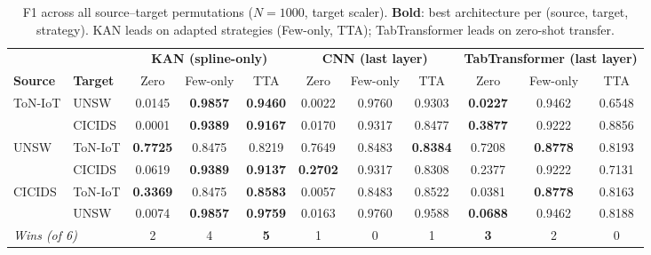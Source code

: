\begin{table}[t]
\centering
\caption{F1 across all source--target permutations ($N{=}1000$, target scaler).
  \textbf{Bold}: best architecture per (source, target, strategy).
  KAN leads on adapted strategies (Few-only, TTA); TabTransformer leads on zero-shot transfer.}
\label{tab:main_results}
\begin{tabular}{l|l|ccc|ccc|ccc}
\toprule
& & \multicolumn{3}{c|}{\textbf{KAN (spline-only)}} & \multicolumn{3}{c|}{\textbf{CNN (last layer)}} & \multicolumn{3}{c}{\textbf{TabTransformer (last layer)}} \\
\textbf{Source} & \textbf{Target} & Zero & Few-only & TTA & Zero & Few-only & TTA & Zero & Few-only & TTA \\
\midrule
\multirow{2}{*}{ToN-IoT}
    & UNSW    & 0.0145 & \textbf{0.9857} & \textbf{0.9460} & 0.0022 & 0.9760 & 0.9303 & \textbf{0.0227} & 0.9462 & 0.6548 \\
    & CICIDS  & 0.0001 & \textbf{0.9389} & \textbf{0.9167} & 0.0170 & 0.9317 & 0.8477 & \textbf{0.3877} & 0.9222 & 0.8856 \\
\midrule
\multirow{2}{*}{UNSW}
    & ToN-IoT & \textbf{0.7725} & 0.8475 & 0.8219 & 0.7649 & 0.8483 & \textbf{0.8384} & 0.7208 & \textbf{0.8778} & 0.8193 \\
    & CICIDS  & 0.0619 & \textbf{0.9389} & \textbf{0.9137} & \textbf{0.2702} & 0.9317 & 0.8308 & 0.2377 & 0.9222 & 0.7131 \\
\midrule
\multirow{2}{*}{CICIDS}
    & ToN-IoT & \textbf{0.3369} & 0.8475 & \textbf{0.8583} & 0.0057 & 0.8483 & 0.8522 & 0.0381 & \textbf{0.8778} & 0.8163 \\
    & UNSW    & 0.0074 & \textbf{0.9857} & \textbf{0.9759} & 0.0163 & 0.9760 & 0.9588 & \textbf{0.0688} & 0.9462 & 0.8188 \\
\midrule
\multicolumn{2}{l|}{\textit{Wins (of 6)}} & 2 & 4 & \textbf{5} & 1 & 0 & 1 & \textbf{3} & 2 & 0 \\
\bottomrule
\end{tabular}
\end{table}
